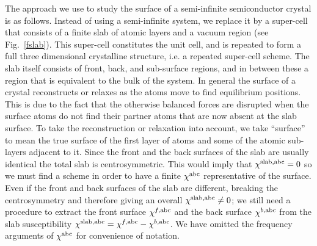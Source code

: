 \documentclass[floatfix,prb,aps,superscriptaddress,11pt,preprint,letterpaper]{revtex4}
\begin{document}
The approach we use to study the surface of a semi-infinite
semiconductor crystal is as follows. Instead of using a
semi-infinite system, we replace it by a super-cell that 
consists of a finite
slab of atomic layers and a vacuum region (see Fig.~\ref{fslab}). This
super-cell constitutes the unit cell, and
is repeated to form a full three dimensional crystalline structure,
i.e. a repeated super-cell scheme. 
The slab itself consists of front, back, and 
sub-surface regions, and in between these
a region that is equivalent to the
bulk of the system. 
In general the surface of a crystal reconstructs or relaxes as the atoms
move to find equilibrium positions. This is due to the fact that
the otherwise
balanced forces are disrupted when the surface atoms do not find their 
partner atoms that are now absent at the slab surface.
To take the reconstruction or relaxation into account, 
we take ``surface'' to mean
the true surface of the first layer of atoms and
some of the atomic sub-layers adjacent to it.
Since the front and the back
surfaces of the slab are usually identical the total slab is
centrosymmetric. This would imply that 
$\chi^{\mathrm{slab},\mathrm{a}\mathrm{b}\mathrm{c}}=0$ so we must
find a scheme 
in order to have a finite $\chi^{\mathrm{a}\mathrm{b}\mathrm{c}}$ representative of the
surface. Even if the front and back surfaces of the slab 
are different, breaking the centrosymmetry and therefore giving an
overall $\chi^{\mathrm{slab},\mathrm{a}\mathrm{b}\mathrm{c}}\ne 0$; we still
need a procedure to extract the front surface $\chi^{f,\mathrm{a}\mathrm{b}\mathrm{c}}$
and the back surface $\chi^{b,\mathrm{a}\mathrm{b}\mathrm{c}}$ from the slab
susceptibility 
$\chi^{\mathrm{slab},\mathrm{a}\mathrm{b}\mathrm{c}}=\chi^{f,\mathrm{a}\mathrm{b}\mathrm{c}}-\chi^{b,\mathrm{a}\mathrm{b}\mathrm{c}}$.
We have omitted the frequency arguments of $\chi^{\mathrm{a}\mathrm{b}\mathrm{c}}$ for 
convenience of notation.
\end{document}
